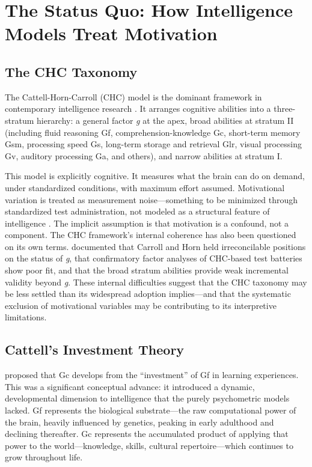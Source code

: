 \documentclass[12pt,a4paper]{article}
\begin{document}
\section{The Status Quo: How Intelligence Models Treat Motivation}

\subsection{The CHC Taxonomy}

The Cattell-Horn-Carroll (CHC) model is the dominant framework in contemporary intelligence research \citep{McGrew2009, SchneiderMcGrew2018}. It arranges cognitive abilities into a three-stratum hierarchy: a general factor \emph{g} at the apex, broad abilities at stratum II (including fluid reasoning Gf, comprehension-knowledge Gc, short-term memory Gsm, processing speed Gs, long-term storage and retrieval Glr, visual processing Gv, auditory processing Ga, and others), and narrow abilities at stratum I.

This model is explicitly cognitive. It measures what the brain can do on demand, under standardized conditions, with maximum effort assumed. Motivational variation is treated as measurement noise---\hspace{0pt}something to be minimized through standardized test administration, not modeled as a structural feature of intelligence \citep{SchneiderMcGrew2018}. The implicit assumption is that motivation is a confound, not a component. The CHC framework's internal coherence has also been questioned on its own terms. \citet{CanivezYoungstrom2019} documented that Carroll and Horn held irreconcilable positions on the status of \emph{g}, that confirmatory factor analyses of CHC-based test batteries show poor fit, and that the broad stratum abilities provide weak incremental validity beyond \emph{g}. These internal difficulties suggest that the CHC taxonomy may be less settled than its widespread adoption implies---\hspace{0pt}and that the systematic exclusion of motivational variables may be contributing to its interpretive limitations.

\subsection{Cattell's Investment Theory}

\citet{Cattell1971} proposed that Gc develops from the ``investment'' of Gf in learning experiences. This was a significant conceptual advance: it introduced a dynamic, developmental dimension to intelligence that the purely psychometric models lacked. Gf represents the biological substrate---\hspace{0pt}the raw computational power of the brain, heavily influenced by genetics, peaking in early adulthood and declining thereafter. Gc represents the accumulated product of applying that power to the world---\hspace{0pt}knowledge, skills, cultural repertoire---\hspace{0pt}which continues to grow throughout life.
\end{document}
